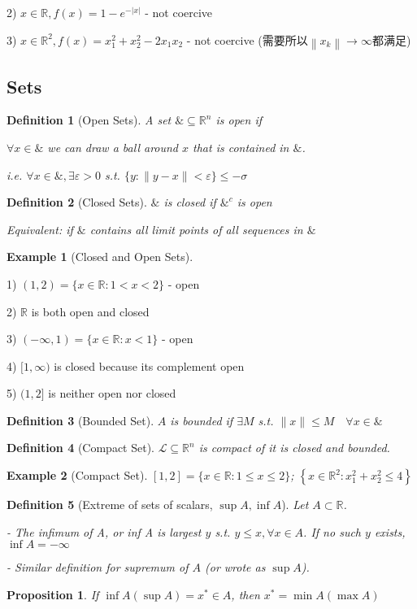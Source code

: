 \documentclass[11pt,a4paper]{article}
\newtheorem{definition}{Definition}
\newtheorem{proposition}{Proposition}
\newtheorem{example}{Example}
\begin{document}
2) $x \in \mathbb{R}, f(x)=1-e^{-|x|}$ - not coercive

3) $x \in \mathbb{R}^{2}, f(x)=x_{1}^{2}+x_{2}^{2}-2 x_{1} x_{2}$ - not coercive
(需要所以$\left\|x_{k}\right\| \rightarrow \infty$都满足)


\subsection{Sets}
\begin{definition}[Open Sets]
    A set $\& \subseteq \mathbb{R}^{n}$ is open if
    
    $\forall x \in \&$ we can draw a ball around $x$ that is contained in $\&$.

    i.e. $\forall x \in \&, \exists \varepsilon>0$ s.t. $\{y:\|y-x\|<\varepsilon\} \leq-\sigma$
\end{definition}

\begin{definition}[Closed Sets]
    $\&$ is closed if $\&^c$ is open

    Equivalent: if $\&$ contains all limit points of all sequences in $\&$
\end{definition}
\begin{example}[Closed and Open Sets]
\end{example}
1) $(1,2)=\{x \in \mathbb{R}: 1<x<2\}$ - open

2) $\mathbb{R}$ is both open and closed

3) $(-\infty, 1)=\{x \in \mathbb{R}: x<1\}$ - open

4) $[1, \infty)$ is closed because its complement open

5) $(1,2]$ is neither open nor closed

\begin{definition}[Bounded Set]
    $A$ is bounded if $\exists M$ s.t. $\|x\| \leqslant M \quad \forall x \in\&$
\end{definition}

\begin{definition}[Compact Set]
    $\mathcal{L} \subseteq \mathbb{R}^{n}$ is compact of it is closed and bounded.
\end{definition}

\begin{example}[Compact Set]
    $[1,2]=\{x \in \mathbb{R}: 1 \leqslant x \leqslant 2\}$; $\left\{x \in \mathbb{R}^{2}\right.: \left.x_{1}^{2}+x_{2}^{2} \leqslant 4\right\}$
\end{example}

\begin{definition}[Extreme of sets of scalars, $\sup A,\inf A$]
    Let $A\subset \mathbb{R}$.

    - The infimum of A, or inf A is largest $y$ s.t. $y \leqslant x, \forall x \in A$. If no such $y$ exists, $\inf A=-\infty$

    - Similar definition for supremum of $A$ (or wrote as $\sup A$).
\end{definition}
\begin{proposition}
    If $\inf A(\sup A)=x^*\in A$, then $x^*=\min A(\max A)$
\end{proposition}
\end{document}
